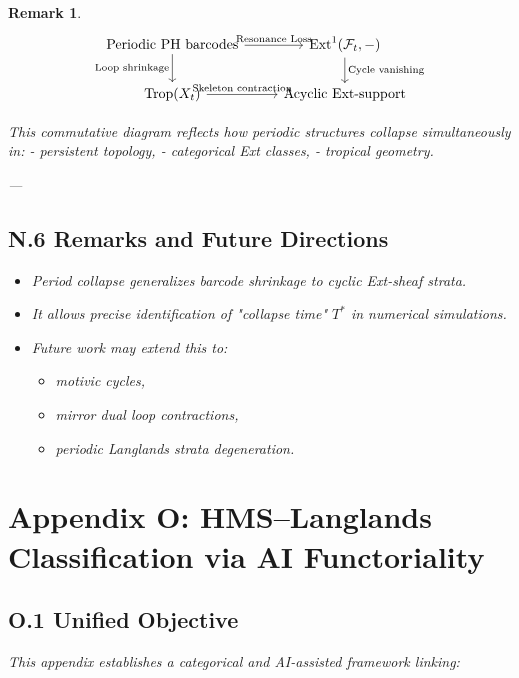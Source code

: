 \documentclass[11pt]{article}
\newtheorem{remark}[theorem]{Remark}
\begin{document}
\begin{remark}
\[
\begin{tikzcd}
\text{Periodic PH barcodes} \arrow[r, "\text{Resonance Loss}"] \arrow[d, "\text{Loop shrinkage}"'] &
\mathrm{Ext}^1(\mathcal{F}_t, -) \arrow[d, "\text{Cycle vanishing}"] \\
\mathrm{Trop}(X_t) \arrow[r, "\text{Skeleton contraction}"] &
\text{Acyclic Ext-support}
\end{tikzcd}
\]

This commutative diagram reflects how periodic structures collapse simultaneously in:
- persistent topology,
- categorical Ext classes,
- tropical geometry.

---

\subsection*{N.6 Remarks and Future Directions}

\begin{itemize}
  \item Period collapse generalizes barcode shrinkage to cyclic Ext-sheaf strata.
  \item It allows precise identification of "collapse time" $T^*$ in numerical simulations.
  \item Future work may extend this to:
    \begin{itemize}
      \item motivic cycles,
      \item mirror dual loop contractions,
      \item periodic Langlands strata degeneration.
    \end{itemize}
\end{itemize}


\section*{Appendix O: HMS–Langlands Classification via AI Functoriality}

\subsection*{O.1 Unified Objective}

This appendix establishes a categorical and AI-assisted framework linking:


\end{remark}
\end{document}
